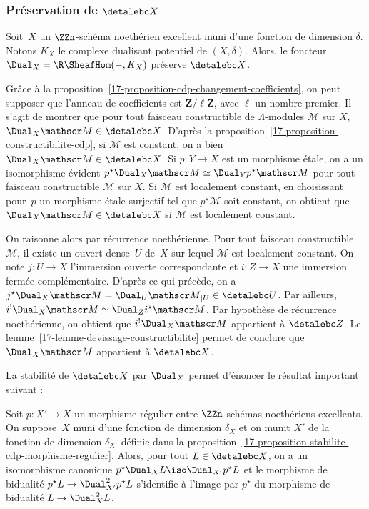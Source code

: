 \documentclass[10pt]{../fichiers-configuration-latex/smfart}
\begin{document}
\subsubsection{Préservation de \texorpdfstring{$\detalebc X$}{Dbc(X,Lambda)}}%

\begin{proposition3}\label{17-proposition-la-dualite-preserve-dbc}
Soit $X$ un $\ZZn$-schéma noethérien excellent muni d'une fonction de dimension
$\delta$. Notons $K_X$ le complexe dualisant potentiel de $(X,\delta)$.
Alors, le foncteur $\Dual_X=\R\SheafHom(-,K_X)$ préserve $\detalebc X$.
\end{proposition3}

Grâce à la proposition~\ref{17-proposition-cdp-changement-coefficients}, on
peut supposer que l'anneau de coefficients est $\mathbf{Z}/\ell\mathbf{Z}$,
avec $\ell$ un nombre premier. Il s'agit de montrer que pour tout faisceau
constructible de $\Lambda$-modules $\mathscr M$ sur $X$,
$\Dual_X \mathscr M\in\detalebc X$. D'après la 
proposition~\ref{17-proposition-constructibilite-cdp}, si $\mathscr M$ est
constant, on a bien $\Dual_X\mathscr M\in\detalebc X$. Si $p\colon Y\to X$ est un
morphisme étale, on a un isomorphisme évident $p^\star
\Dual_X\mathscr M\simeq \Dual_Y p^\star\mathscr M$ pour tout
faisceau constructible $\mathscr M$ sur $X$. Si $\mathscr M$ est localement
constant, en choisissant pour $p$ un morphisme étale surjectif tel que
$p^\star \mathscr M$ soit constant,
on obtient que $\Dual_X\mathscr M\in\detalebc X$ si $\mathscr M$
est localement constant.

On raisonne alors par récurrence noethérienne. Pour tout faisceau
constructible $\mathscr M$, il existe un ouvert dense $U$ de $X$ sur lequel
$\mathscr M$ est localement constant. On note $j\colon U\to X$ l'immersion
ouverte correspondante et $i\colon Z\to X$ une immersion fermée
complémentaire. D'après ce qui précède, on a $j^\star \Dual_X\mathscr
M=\Dual_U{\mathscr M}_{|U}\in\detalebc U$. Par ailleurs, $i^!\Dual_X\mathscr
M\simeq \Dual_Zi^\star \mathscr M$. Par hypothèse de récurrence
noethérienne, on obtient que $i^!\Dual_X\mathscr M$ appartient à
$\detalebc Z$. Le
lemme~\ref{17-lemme-devissage-constructibilite} permet de conclure que
$\Dual_X\mathscr M$ appartient à $\detalebc X$.

\medskip

La stabilité de $\detalebc X$ par $\Dual_X$ permet d'énoncer le résultat
important suivant :

\begin{proposition3}\label{17-proposition-comportement-dualite-morphisme-regulier}
Soit $p\colon X'\to X$ un morphisme régulier
entre $\ZZn$-schémas noethériens excellents. On suppose $X$ muni
d'une fonction de dimension $\delta_X$ et on munit $X'$ de la fonction de
dimension $\delta_{X'}$ définie dans 
la proposition~\ref{17-proposition-stabilite-cdp-morphisme-regulier}. Alors,
pour tout $L\in \detalebc X$, on a un isomorphisme canonique $p^\star\Dual_X
L\iso \Dual_{X'}p^\star L$ et le morphisme de bidualité
$p^\star L\to\Dual^2_{X'} p^\star L$
s'identifie à l'image par $p^\star$ du morphisme de
bidualité $L\to \Dual^2_X L$.
\end{proposition3}
\end{document}

